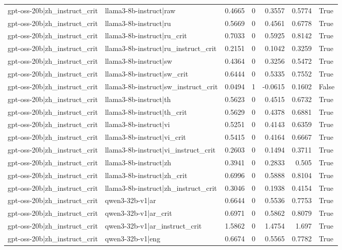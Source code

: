 \begin{table}
\begin{tabular}{l l r r r r l}
gpt-oss-20b|zh_instruct_crit & llama3-8b-instruct|raw & 0.4665 & 0 & 0.3557 & 0.5774 & True \\
gpt-oss-20b|zh_instruct_crit & llama3-8b-instruct|ru & 0.5669 & 0 & 0.4561 & 0.6778 & True \\
gpt-oss-20b|zh_instruct_crit & llama3-8b-instruct|ru_crit & 0.7033 & 0 & 0.5925 & 0.8142 & True \\
gpt-oss-20b|zh_instruct_crit & llama3-8b-instruct|ru_instruct_crit & 0.2151 & 0 & 0.1042 & 0.3259 & True \\
gpt-oss-20b|zh_instruct_crit & llama3-8b-instruct|sw & 0.4364 & 0 & 0.3256 & 0.5472 & True \\
gpt-oss-20b|zh_instruct_crit & llama3-8b-instruct|sw_crit & 0.6444 & 0 & 0.5335 & 0.7552 & True \\
gpt-oss-20b|zh_instruct_crit & llama3-8b-instruct|sw_instruct_crit & 0.0494 & 1 & -0.0615 & 0.1602 & False \\
gpt-oss-20b|zh_instruct_crit & llama3-8b-instruct|th & 0.5623 & 0 & 0.4515 & 0.6732 & True \\
gpt-oss-20b|zh_instruct_crit & llama3-8b-instruct|th_crit & 0.5629 & 0 & 0.4378 & 0.6881 & True \\
gpt-oss-20b|zh_instruct_crit & llama3-8b-instruct|vi & 0.5251 & 0 & 0.4143 & 0.6359 & True \\
gpt-oss-20b|zh_instruct_crit & llama3-8b-instruct|vi_crit & 0.5415 & 0 & 0.4164 & 0.6667 & True \\
gpt-oss-20b|zh_instruct_crit & llama3-8b-instruct|vi_instruct_crit & 0.2603 & 0 & 0.1494 & 0.3711 & True \\
gpt-oss-20b|zh_instruct_crit & llama3-8b-instruct|zh & 0.3941 & 0 & 0.2833 & 0.505 & True \\
gpt-oss-20b|zh_instruct_crit & llama3-8b-instruct|zh_crit & 0.6996 & 0 & 0.5888 & 0.8104 & True \\
gpt-oss-20b|zh_instruct_crit & llama3-8b-instruct|zh_instruct_crit & 0.3046 & 0 & 0.1938 & 0.4154 & True \\
gpt-oss-20b|zh_instruct_crit & qwen3-32b-v1|ar & 0.6644 & 0 & 0.5536 & 0.7753 & True \\
gpt-oss-20b|zh_instruct_crit & qwen3-32b-v1|ar_crit & 0.6971 & 0 & 0.5862 & 0.8079 & True \\
gpt-oss-20b|zh_instruct_crit & qwen3-32b-v1|ar_instruct_crit & 1.5862 & 0 & 1.4754 & 1.697 & True \\
gpt-oss-20b|zh_instruct_crit & qwen3-32b-v1|eng & 0.6674 & 0 & 0.5565 & 0.7782 & True \\

\end{tabular}
\end{table}

